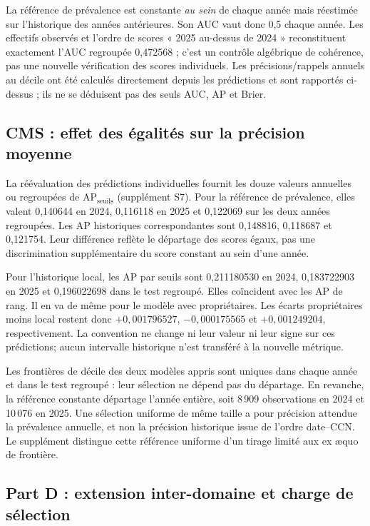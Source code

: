 La référence de prévalence est constante \emph{au sein} de chaque année mais réestimée sur l'historique des années antérieures\cite{hgbcode}. Son AUC vaut donc 0,5 chaque année. Les effectifs observés et l'ordre de scores « 2025 au-dessus de 2024 » reconstituent exactement l'AUC regroupée 0,472568 ; c'est un contrôle algébrique de cohérence, pas une nouvelle vérification des scores individuels. Les précisions/rappels annuels au décile ont été calculés directement depuis les prédictions et sont rapportés ci-dessus ; ils ne se déduisent pas des seuls AUC, AP et Brier.

\subsection{CMS : effet des égalités sur la précision moyenne}
\label{sec:ties}
La réévaluation des prédictions individuelles fournit les douze valeurs annuelles ou regroupées de $\mathrm{AP}_{\mathrm{seuils}}$ (supplément S7). Pour la référence de prévalence, elles valent 0,140644 en 2024, 0,116118 en 2025 et 0,122069 sur les deux années regroupées. Les AP historiques correspondantes sont 0,148816, 0,118687 et 0,121754. Leur différence reflète le départage des scores égaux, pas une discrimination supplémentaire du score constant au sein d'une année.

Pour l'historique local, les AP par seuils sont 0,211180530 en 2024, 0,183722903 en 2025 et 0,196022698 dans le test regroupé. Elles coïncident avec les AP de rang. Il en va de même pour le modèle avec propriétaires. Les écarts propriétaires moins local restent donc $+0,001796527$, $-0,000175565$ et $+0,001249204$, respectivement. La convention ne change ni leur valeur ni leur signe sur ces prédictions; aucun intervalle historique n'est transféré à la nouvelle métrique.

Les frontières de décile des deux modèles appris sont uniques dans chaque année et dans le test regroupé : leur sélection ne dépend pas du départage. En revanche, la référence constante départage l'année entière, soit 8\,909 observations en 2024 et 10\,076 en 2025. Une sélection uniforme de même taille a pour précision attendue la prévalence annuelle, et non la précision historique issue de l'ordre date--CCN. Le supplément distingue cette référence uniforme d'un tirage limité aux ex æquo de frontière.

\subsection{Part D : extension inter-domaine et charge de sélection}

